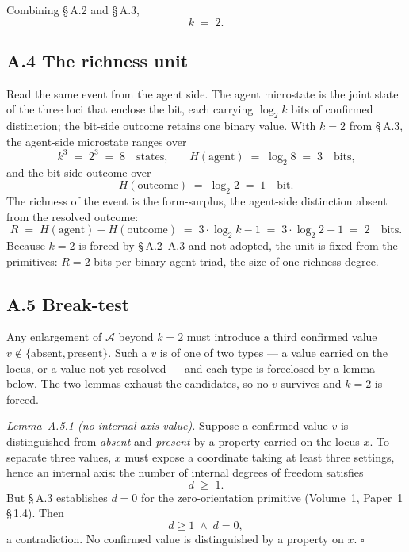 \documentclass[11pt,oneside]{report}
\theoremstyle{definition}
\theoremstyle{remark}
\begin{document}
Combining \S\,A.2 and \S\,A.3,
\[
  k \;=\; 2.
\]

\subsection*{A.4 The richness unit}
Read the same event from the agent side. The agent microstate is the joint state of the
three loci that enclose the bit, each carrying \ensuremath{\log_2 k} bits of confirmed
distinction; the bit-side outcome retains one binary value. With \ensuremath{k = 2} from
\S\,A.3, the agent-side microstate ranges over
\[
  k^{3} \;=\; 2^{3} \;=\; 8 \quad\text{states,} \qquad
  H(\text{agent}) \;=\; \log_2 8 \;=\; 3 \quad\text{bits,}
\]
and the bit-side outcome over
\[
  H(\text{outcome}) \;=\; \log_2 2 \;=\; 1 \quad\text{bit.}
\]
The richness of the event is the form-surplus, the agent-side distinction absent from the
resolved outcome:
\[
  R \;=\; H(\text{agent}) - H(\text{outcome})
    \;=\; 3 \cdot \log_2 k - 1
    \;=\; 3 \cdot \log_2 2 - 1
    \;=\; 2 \quad\text{bits.}
\]
Because \ensuremath{k = 2} is forced by \S\,A.2--A.3 and not adopted, the unit is fixed from
the primitives: \ensuremath{R = 2} bits per binary-agent triad, the size of one richness
degree.

\subsection*{A.5 Break-test}
Any enlargement of \ensuremath{\mathcal{A}} beyond \ensuremath{k = 2} must introduce a third
confirmed value \ensuremath{v \notin \{\text{absent}, \text{present}\}}. Such a \ensuremath{v}
is of one of two types --- a value carried on the locus, or a value not yet resolved --- and
each type is foreclosed by a lemma below. The two lemmas exhaust the candidates, so no
\ensuremath{v} survives and \ensuremath{k = 2} is forced.

\emph{Lemma~A.5.1 (no internal-axis value).} Suppose a confirmed value \ensuremath{v} is
distinguished from \emph{absent} and \emph{present} by a property carried on the locus
\ensuremath{x}. To separate three values, \ensuremath{x} must expose a coordinate taking at least
three settings, hence an internal axis: the number of internal degrees of freedom satisfies
\[
  d \;\geq\; 1.
\]
But \S\,A.3 establishes \ensuremath{d = 0} for the zero-orientation primitive (Volume~1, Paper~1
\S\,1.4). Then
\[
  d \geq 1 \;\wedge\; d = 0,
\]
a contradiction. No confirmed value is distinguished by a property on \ensuremath{x}. \(\square\)
\end{document}
